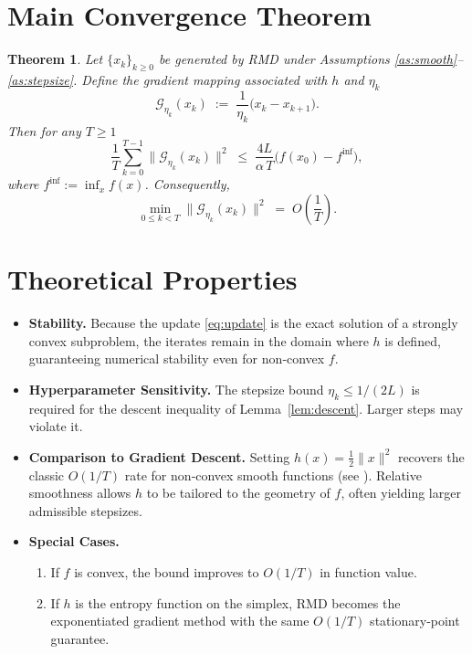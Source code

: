 \documentclass{article}
\newtheorem{theorem}{Theorem}
\begin{document}
\section*{Main Convergence Theorem}
\begin{theorem}\label{thm:main}
Let $\{x_{k}\}_{k\ge0}$ be generated by RMD under Assumptions \ref{as:smooth}–\ref{as:stepsize}. Define the \emph{gradient mapping} associated with $h$ and $\eta_{k}$
\[
\mathcal{G}_{\eta_{k}}(x_{k})\;:=\;\frac{1}{\eta_{k}}\bigl(x_{k}-x_{k+1}\bigr).
\]
Then for any $T\ge1$
\[
\frac{1}{T}\sum_{k=0}^{T-1}\|\mathcal{G}_{\eta_{k}}(x_{k})\|^{2}
\;\le\;
\frac{4L}{\alpha\,T}\bigl(f(x_{0})-f^{\inf}\bigr),
\]
where $f^{\inf}:=\inf_{x}f(x)$. Consequently,
\[
\min_{0\le k<T}\|\mathcal{G}_{\eta_{k}}(x_{k})\|^{2}
\;=\;O\!\left(\frac{1}{T}\right).
\]
\end{theorem}

\section*{Theoretical Properties}
\begin{itemize}[leftmargin=*]
\item \textbf{Stability.} Because the update \eqref{eq:update} is the exact solution of a strongly convex subproblem, the iterates remain in the domain where $h$ is defined, guaranteeing numerical stability even for non‑convex $f$.
\item \textbf{Hyperparameter Sensitivity.} The stepsize bound $\eta_{k}\le1/(2L)$ is required for the descent inequality of Lemma~\ref{lem:descent}. Larger steps may violate it.
\item \textbf{Comparison to Gradient Descent.} Setting $h(x)=\frac12\|x\|^{2}$ recovers the classic $O(1/T)$ rate for non‑convex smooth functions (see \cite{ghadimi2013stochastic}). Relative smoothness allows $h$ to be tailored to the geometry of $f$, often yielding larger admissible stepsizes.
\item \textbf{Special Cases.}
    \begin{enumerate}
        \item If $f$ is convex, the bound improves to $O(1/T)$ in function value.
        \item If $h$ is the entropy function on the simplex, RMD becomes the exponentiated gradient method with the same $O(1/T)$ stationary‑point guarantee.
    \end{enumerate}
\end{itemize}
\end{document}
